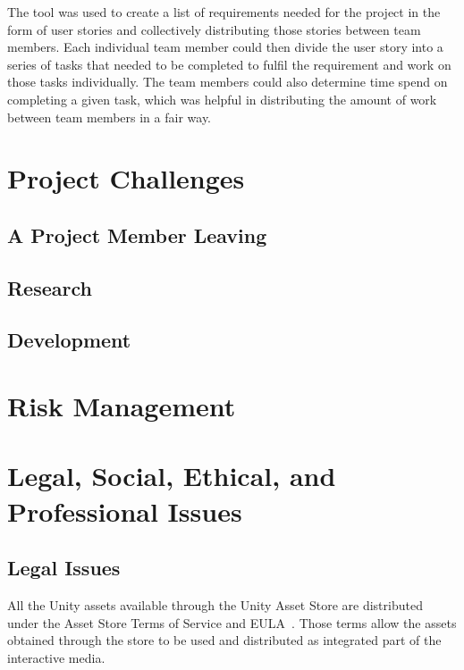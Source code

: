         The tool was used to create a list of requirements needed for the project in the form of user stories and collectively distributing those stories between team members. Each individual team member could then divide the user story into a series of tasks that needed to be completed to fulfil the requirement and work on those tasks individually. The team members could also determine time spend on completing a given task, which was helpful in distributing the amount of work between team members in a fair way.

\section{Project Challenges}

    \subsection{A Project Member Leaving}
    
    \subsection{Research}
    
    \subsection{Development}

\section{Risk Management}


\section{Legal, Social, Ethical, and Professional Issues}
    \subsection{Legal Issues}
    \label{sec:legal}
        All the Unity assets available through the Unity Asset Store are distributed under the Asset Store Terms of Service and EULA~\cite{unity:terms}. Those terms allow the assets obtained through the store to be used and distributed as integrated part of the interactive media.
    
